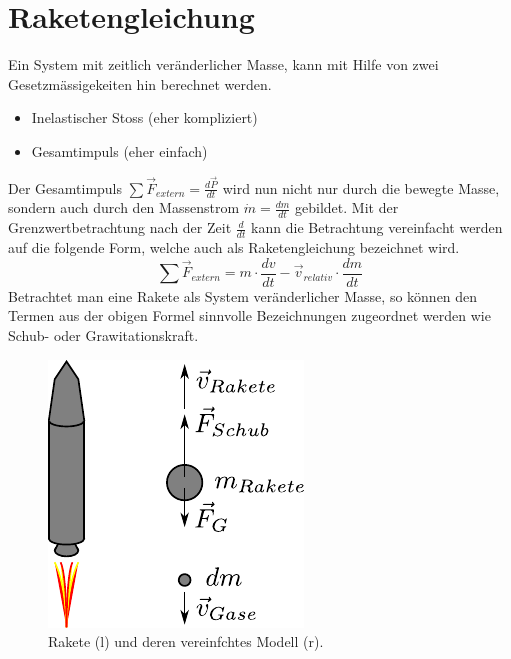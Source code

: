\section{Raketengleichung}\label{sec:raketengleichung}
Ein System mit zeitlich veränderlicher Masse, kann mit Hilfe von zwei
Gesetzmässigekeiten hin berechnet werden.
\begin{itemize}
	\item Inelastischer Stoss (eher kompliziert)
	\item Gesamtimpuls (eher einfach)
\end{itemize}
Der Gesamtimpuls $\sum \vec{F}_{extern} = \frac{d\vec{P}}{dt}$ wird nun
nicht nur durch die bewegte Masse, sondern auch durch den Massenstrom 
$\dot{m}=\frac{dm}{dt}$ gebildet. 
Mit der Grenzwertbetrachtung nach der Zeit $\frac{d}{dt}$ kann die
Betrachtung vereinfacht werden auf die folgende Form, welche auch
als Raketengleichung bezeichnet wird.
\[  \boxed{
	\sum \vec{F}_{extern} 
		= m \cdot \frac{dv}{dt} 
		- \vec{v}_{relativ} \cdot \frac{dm}{dt}
	} \]
Betrachtet man eine Rakete als System veränderlicher Masse, so können 
den Termen aus der obigen Formel sinnvolle Bezeichnungen zugeordnet 
werden wie Schub- oder Grawitationskraft.
\begin{figure}[h!]
	\centering
	\includegraphics[scale=0.8]{rakete.pdf}
	\caption{Rakete (l) und deren vereinfchtes Modell (r).}
	\label{fig:rakete}
\end{figure}

